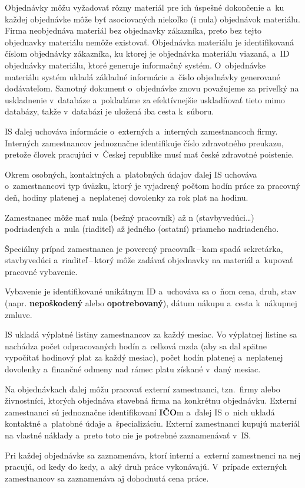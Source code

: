 \documentclass[a4paper]{article}
\begin{document}
Objednávky môžu vyžadovať rôzny materiál pre ich úspešné dokončenie a~ku každej objednávke môže byť asociovaných niekoľko (i nula) objednávok materiálu.
Firma neobjednáva materiál bez objednavky zákazníka, preto bez tejto objednavky materiálu nemôže existovať.
Objednávka materiálu je identifikovaná číslom objednávky zákazníka, ku ktorej je objednávka materiálu viazaná, a~ID objednávky materiálu, ktoré generuje informačný systém.
O~objednávke materiálu systém ukladá základné informácie a~číslo objednávky generované dodávateľom.
Samotný dokument o~objednávke znovu považujeme za priveľký na uskladnenie v~databáze a~pokladáme za efektívnejšie uskladňovať tieto mimo databázy, takže v~databázi je uložená iba cesta k~súboru.

IS ďalej uchováva informácie o~externých a~interných zamestnancoch firmy.
Interných zamestnancov jednoznačne identifikuje číslo zdravotného preukazu, pretože človek pracujúci v~Českej republike musí mať české zdravotné poistenie.

Okrem osobných, kontaktných a~platobných údajov ďalej IS uchováva o~zamestnancovi typ úväzku, ktorý je vyjadrený počtom hodín práce za pracovný deň, hodiny platenej a~neplatenej dovolenky za rok plat na hodinu.

Zamestnanec môže mať nula (bežný pracovník) až n (stavbyvedúci\dots) podriadených a~nula (riaditeľ) až jedného (ostatní) priameho nadriadeného.

Špeciálny prípad zamestnanca je poverený pracovník\,--\,kam spadá sekretárka, stavbyvedúci a~riaditeľ\,--\,ktorý môže zadávať objednavky na materiál a~kupovať pracovné vybavenie.

Vybavenie je identifikované unikátnym ID a~uchováva sa o~ňom cena, druh, stav (napr. \textbf{nepoškodený} alebo \textbf{opotrebovaný}), dátum nákupu a~cesta k~nákupnej zmluve.

IS ukladá výplatné listiny zamestnancov za každý mesiac. Vo výplatnej listine sa nachádza počet odpracovaných hodín a~celková mzda (aby sa dal spätne vypočítať hodinový plat za každý mesiac), počet hodín platenej a~neplatenej dovolenky a~finančné odmeny nad rámec platu získané v~daný mesiac.

Na objednávkach ďalej môžu pracovať externí zamestnanci, tzn.\ firmy alebo živnostníci, ktorých objednáva stavebná firma na konkrétnu objednávku.
Externí zamestnanci sú jednoznačne identifikovaní \textbf{IČO}m a~ďalej IS o~nich ukladá kontaktné a~platobné údaje a~špecializáciu.
Externí zamestnanci kupujú materiál na vlastné náklady a~preto toto nie je potrebné zaznamenávať v~IS.\@

Pri každej objednávke sa zaznamenáva, ktorí interní a~externí zamestnenci na nej pracujú, od kedy do kedy, a~aký druh práce vykonávajú.
V~prípade externých zamestnancov sa zaznamenáva aj dohodnutá cena práce.
\end{document}

